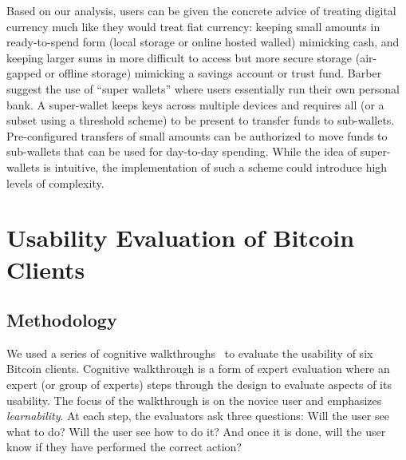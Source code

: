 Based on our analysis, users can be given the concrete advice of treating digital currency much like they would treat fiat currency: keeping small amounts in ready-to-spend form (\eg local storage or online hosted walled) mimicking cash, and keeping larger sums in more difficult to access but more secure storage (\eg air-gapped or offline storage) mimicking a savings account or trust fund. Barber \etal~\cite{Barber2012} suggest the use of ``super wallets'' where users essentially run their own personal bank. A super-wallet keeps keys across multiple devices and requires all (or a subset using a threshold scheme) to be present to transfer funds to sub-wallets. Pre-configured transfers of small amounts can be authorized to move funds to sub-wallets that can be used for day-to-day spending. While the idea of super-wallets is intuitive, the implementation of such a scheme could introduce high levels of complexity. 





\section{Usability Evaluation of Bitcoin Clients}

\subsection{Methodology}

We used a series of cognitive walkthroughs~\cite{WRLP94} to evaluate the usability of six Bitcoin clients. Cognitive walkthrough is a form of expert evaluation where an expert (or group of experts) steps through the design to evaluate aspects of its usability. The focus of the walkthrough is on the novice user and emphasizes \emph{learnability}. At each step, the evaluators ask three questions: Will the user see what to do? Will the user see how to do it? And once it is done, will the user know if they have performed the correct action?

